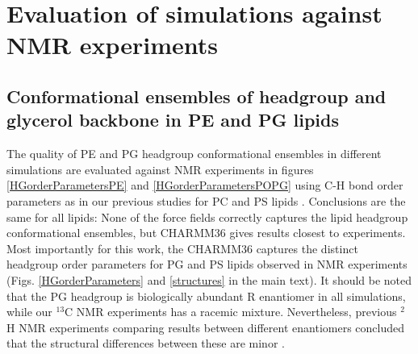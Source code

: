 \documentclass[journal=jpcbfk]{achemso}
\begin{document}
\clearpage
\section{Evaluation of simulations against NMR experiments}
\subsection{Conformational ensembles of headgroup and glycerol backbone in PE and PG lipids}
The quality of PE and PG headgroup conformational ensembles in different simulations are evaluated against NMR experiments in figures \ref{HGorderParametersPE} and \ref{HGorderParametersPOPG} using C-H bond order parameters as in our previous studies for PC and PS lipids \cite{botan15,antila19}. Conclusions are the same for all lipids: None of the force fields correctly captures the lipid headgroup conformational ensembles, but CHARMM36 gives results closest to experiments. Most importantly for this work, the CHARMM36 captures the distinct headgroup order parameters for PG and PS lipids observed in NMR experiments (Figs. \ref{HGorderParameters} and \ref{structures} in the main text).
It should be noted that the PG headgroup is biologically abundant R enantiomer in all simulations, while our $^{13}$C NMR experiments has a racemic mixture. Nevertheless, previous $^{2}$H NMR experiments comparing results between different enantiomers concluded that the structural differences between these are minor \cite{wohlgemuth80}.

\end{document}
